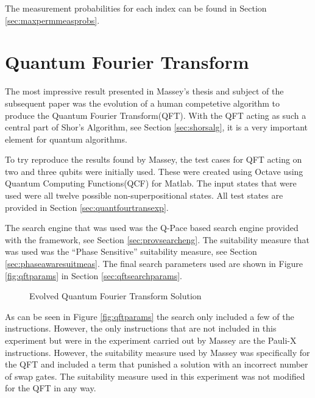 The measurement probabilities for each index can be found in Section \ref{sec:maxpermmeasprobs}.



\section{Quantum Fourier Transform}
\label{sec:evoqft}

The most impressive result presented in Massey's thesis\cite{masseythesis} and subject of the subsequent paper\cite{Massey:2005:EHQ:1068009.1068288} was the evolution of a human competetive algorithm to produce the Quantum Fourier Transform(QFT).
With the QFT acting as such a central part of Shor's Algorithm, see Section \ref{sec:shorsalg}, it is a very important element for quantum algorithms.

To try reproduce the results found by Massey, the test cases for QFT acting on two and three qubits were initially used.
These were created using Octave\cite{octweb} using Quantum Computing Functions(QCF) for Matlab\cite{qcfweb}.
The input states that were used were all twelve possible non-superpositional states.
All test states are provided in Section \ref{sec:quantfourtransexp}.

The search engine that was used was the Q-Pace based search engine provided with the framework, see Section \ref{sec:provsearcheng}.
The suitability measure that was used was the ``Phase Sensitive'' suitability measure, see Section \ref{sec:phaseawaresuitmeas}.
The final search parameters used are shown in Figure \ref{fig:qftparams} in Section \ref{sec:qftsearchparams}.

\begin{figure}
\centering
{}
\caption{Evolved Quantum Fourier Transform Solution}
\label{fig:evoqftsol}
\end{figure}

As can be seen in Figure \ref{fig:qftparams} the search only included a few of the instructions.
However, the only instructions that are not included in this experiment but were in the experiment carried out by Massey are the Pauli-X instructions.
However, the suitability measure used by Massey was specifically for the QFT and included a term that punished a solution with an incorrect number of swap gates.
The suitability measure used in this experiment was not modified for the QFT in any way.

